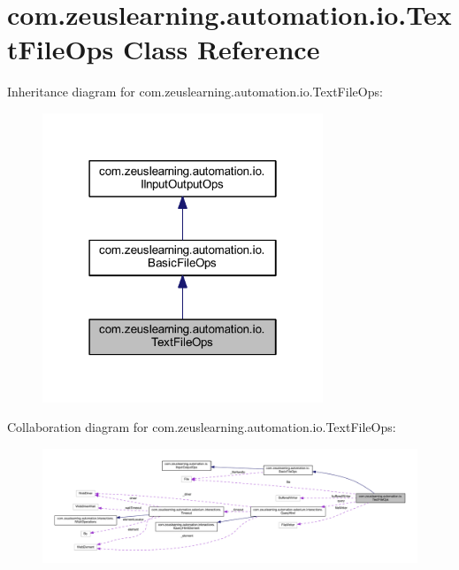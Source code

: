 \hypertarget{classcom_1_1zeuslearning_1_1automation_1_1io_1_1TextFileOps}{}\section{com.\+zeuslearning.\+automation.\+io.\+Text\+File\+Ops Class Reference}
\label{classcom_1_1zeuslearning_1_1automation_1_1io_1_1TextFileOps}


Inheritance diagram for com.\+zeuslearning.\+automation.\+io.\+Text\+File\+Ops\+:\nopagebreak
\begin{figure}[H]
\begin{center}
\leavevmode
\includegraphics[width=238pt]{dc/df8/classcom_1_1zeuslearning_1_1automation_1_1io_1_1TextFileOps__inherit__graph}
\end{center}
\end{figure}


Collaboration diagram for com.\+zeuslearning.\+automation.\+io.\+Text\+File\+Ops\+:
\nopagebreak
\begin{figure}[H]
\begin{center}
\leavevmode
\includegraphics[width=350pt]{d5/dee/classcom_1_1zeuslearning_1_1automation_1_1io_1_1TextFileOps__coll__graph}
\end{center}
\end{figure}
